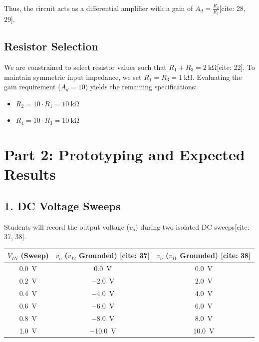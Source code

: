 \documentclass[11pt]{article}
\begin{document}
Thus, the circuit acts as a differential amplifier with a gain of $A_d = \frac{R_2}{R_1}$[cite: 28, 29].

\subsection*{Resistor Selection}
We are constrained to select resistor values such that $R_1 + R_3 = \SI{2}{\kilo\ohm}$[cite: 22]. To maintain symmetric input impedance, we set $R_1 = R_3 = \SI{1}{\kilo\ohm}$.
Evaluating the gain requirement ($A_d = 10$) yields the remaining specifications:
\begin{itemize}
  \item $R_2 = 10 \cdot R_1 = \SI{10}{\kilo\ohm}$
  \item $R_4 = 10 \cdot R_3 = \SI{10}{\kilo\ohm}$
\end{itemize}

\vspace{0.2in}
\section*{Part 2: Prototyping and Expected Results}

\subsection*{1. DC Voltage Sweeps}
Students will record the output voltage ($v_o$) during two isolated DC sweeps[cite: 37, 38].

\begin{table}[H]
  \centering
  \begin{tabular}{ccc}
    \toprule
    \textbf{$V_{IN}$ (Sweep)} & \textbf{$v_o$ ($v_{I2}$ Grounded) [cite: 37]} & \textbf{$v_o$ ($v_{I1}$ Grounded) [cite: 38]} \\
    \midrule
    \SI{0.0}{\volt} & \SI{0.0}{\volt} & \SI{0.0}{\volt} \\
    \SI{0.2}{\volt} & \SI{-2.0}{\volt} & \SI{2.0}{\volt} \\
    \SI{0.4}{\volt} & \SI{-4.0}{\volt} & \SI{4.0}{\volt} \\
    \SI{0.6}{\volt} & \SI{-6.0}{\volt} & \SI{6.0}{\volt} \\
    \SI{0.8}{\volt} & \SI{-8.0}{\volt} & \SI{8.0}{\volt} \\
    \SI{1.0}{\volt} & \SI{-10.0}{\volt} & \SI{10.0}{\volt} \\
    \bottomrule
  \end{tabular}
\end{table}
\end{document}
